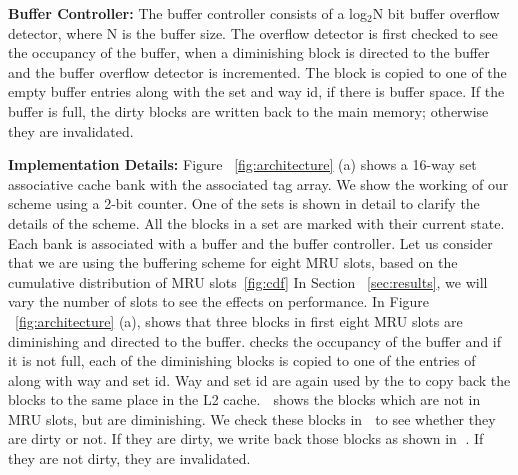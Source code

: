 \noindent\textbf{Buffer Controller:}
The buffer controller consists of a log$_2$N bit buffer overflow detector, where N is the buffer size.
The overflow detector is first checked to see the occupancy of the buffer,
when a diminishing block is directed to the buffer and the buffer overflow detector is incremented.
The block is copied to one of the empty buffer entries along with the set and way id, if there is
buffer space.
If the buffer is full, the dirty blocks are written back to the main memory; otherwise they are  invalidated.

\noindent\textbf{Implementation Details:}
Figure ~\ref{fig:architecture} (a) shows a 16-way set associative cache bank with the associated tag array.
We show the working of
our scheme using a 2-bit counter.  One of the sets is shown in detail to clarify the details of the scheme.
All the blocks in a set are marked with their current state. Each bank is  associated with a buffer and the buffer controller.
Let us consider that we are using the buffering scheme for eight MRU slots, based on the cumulative distribution
of MRU slots~\ref{fig:cdf}
In Section ~\ref{sec:results}, we will vary the number of slots to see the effects on performance.
In Figure  ~\ref{fig:architecture} (a),  shows that three blocks in first eight MRU slots are diminishing and directed to the buffer.  checks
the occupancy of the buffer and if it is not full, each of the diminishing blocks is copied to one of the entries
of  along with way and set id. Way and set id are again used by the   to copy back the blocks to
the same place in the L2 cache. \textcircled{\raisebox{-.9pt}{A}} shows the blocks which are not in MRU slots,
but are diminishing. We check these blocks in \textcircled{\raisebox{-.9pt}{B}} to see whether they are dirty or not.
If they are dirty, we write back those blocks as shown in \textcircled{\raisebox{-.9pt}{C}}.  If they are not dirty, they are invalidated.



\begin{figure*} [t]
\centering
  \caption{\label{fig:cdf} \scriptsize \bf Cumulative Distribution of Dead Blocks per Bank with number of ways.}
\end{figure*}



